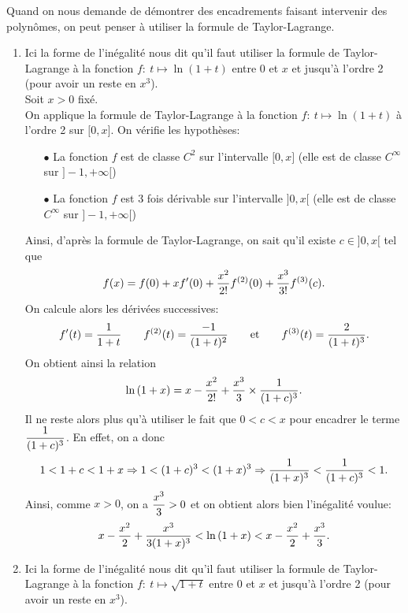 \documentclass[a4paper, 11pt,reqno]{article}
\begin{document}
\begin{correction}
	Quand on nous demande de d\'emontrer des encadrements faisant intervenir des polyn\^omes, on peut penser \`a utiliser la formule de Taylor-Lagrange.
	\begin{enumerate}
		\item Ici la forme de l'in\'egalit\'e nous dit qu'il faut utiliser la formule de Taylor-Lagrange \`a la fonction $f:\ t\mapsto \ln{(1+t)}$ entre $0$ et $x$ et jusqu'\`a l'ordre 2 (pour avoir un reste en $x^3$).\\
		      \noindent Soit $x>0$ fix\'e.\\
		      \noindent On applique la formule de Taylor-Lagrange \`a la fonction $f:\ t\mapsto \ln{(1+t)}$ \`a l'ordre 2 sur $\lbrack 0,x\rbrack$. On v\'erifie les hypoth\`eses:
		      \begin{itemize}
			      \item[$\bullet$] La fonction $f$ est de classe $C^2$ sur l'intervalle $\lbrack 0,x\rbrack$ (elle est de classe $C^{\infty}$ sur $\rbrack -1,+\infty\lbrack$)
			      \item[$\bullet$]  La fonction $f$ est $3$ fois d\'erivable sur l'intervalle $\rbrack 0,x\lbrack$ (elle est de classe $C^{\infty}$ sur $\rbrack -1,+\infty\lbrack$)
		      \end{itemize}
		      Ainsi, d'apr\`es la formule de Taylor-Lagrange, on sait qu'il existe $c\in\rbrack 0,x\lbrack$ tel que
		      $$f(x)=f(0)+xf^{\prime}(0)+\displaystyle\frac{x^2}{2!}f^{(2)}(0)+\displaystyle\frac{x^3}{3!}f^{(3)}(c).$$
		      On calcule alors les d\'eriv\'ees successives:
		      $$f^{\prime}(t)=\displaystyle\frac{1}{1+t}\qquad f^{(2)}(t)=\displaystyle\frac{-1}{(1+t)^2}\qquad \hbox{et}\qquad f^{(3)}(t)=\displaystyle\frac{2}{(1+t)^3}.$$
		      On obtient ainsi la relation
		      $$\ln{(1+x)}=x-\displaystyle\frac{x^2}{2!}+\displaystyle\frac{x^3}{3}\times\displaystyle\frac{1}{(1+c)^3}.$$
		      Il ne reste alors plus qu'\`a utiliser le fait que $0<c<x$ pour encadrer le terme $\displaystyle\frac{1}{(1+c)^3}$. En effet, on a donc
		      $$1<1+c<1+x\Rightarrow 1<(1+c)^3<(1+x)^3\Rightarrow \displaystyle\frac{1}{(1+x)^3}<\frac{1}{(1+c)^3}<1.$$
		      Ainsi, comme $x>0$, on a $\displaystyle\frac{x^3}{3}>0$ et on obtient alors bien l'in\'egalit\'e voulue:
		      $$x-\displaystyle\frac{x^2}{2}+\displaystyle\frac{x^3}{3(1+x)^3}<\ln{(1+x)}<x-\displaystyle\frac{x^2}{2}+\displaystyle\frac{x^3}{3}.$$
		\item Ici la forme de l'in\'egalit\'e nous dit qu'il faut utiliser la formule de Taylor-Lagrange \`a la fonction $f:\ t\mapsto \sqrt{1+t}$ entre $0$ et $x$ et jusqu'\`a l'ordre 2 (pour avoir un reste en $x^3$).\\

\end{enumerate}
\end{correction}
\end{document}
